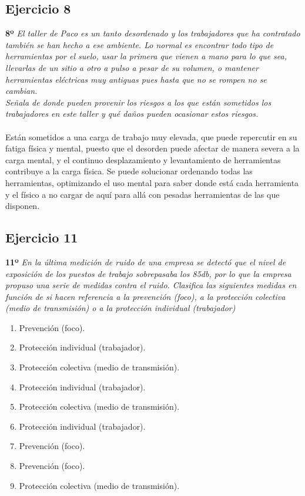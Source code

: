 \documentclass{article}
\begin{document}
      \subsection{Ejercicio 8}
        \textbf{8º} \textit{El taller de Paco es un tanto desordenado y los trabajadores que ha contratado también se han hecho a ese
        ambiente. Lo normal es encontrar todo tipo de herramientas por el suelo, usar la primera que vienen a mano para lo que sea, 
        llevarlas de un sitio a otro a pulso a pesar de su volumen, o mantener herramientas eléctricas muy antiguas pues hasta que no 
        se rompen no se cambian.\\
        Señala de donde pueden provenir los riesgos a los que están sometidos los trabajadores en este taller y qué daños pueden ocasionar
        estos riesgos.}
        \\\\
        Están sometidos a una carga de trabajo muy elevada, que puede repercutir en su fatiga física y mental, puesto que el desorden puede 
        afectar de manera severa a la carga mental, y el continuo desplazamiento y levantamiento de herramientas contribuye a la carga física.
        Se puede solucionar ordenando todas las herramientas, optimizando el uso mental para saber donde está cada herramienta y el físico a no
        cargar de aquí para allá con pesadas herramientas de las que disponen.

      \subsection{Ejercicio 11}

        \textbf{11º} \textit{En la última medición de ruido de una empresa se detectó que el nivel de exposición de los puestos de trabajo sobrepasaba los 85db, por lo que la 
        empresa propuso una serie de medidas contra el ruido. Clasifica las siguientes medidas en función de si hacen referencia a la prevención (foco), a la protección colectiva 
        (medio de transmisión) o a la protección individual (trabajador)}
        \begin{enumerate}
          \item Prevención (foco).
          \item Protección individual (trabajador).
          \item Protección colectiva (medio de transmisión).
          \item Protección individual (trabajador).
          \item Protección colectiva (medio de transmisión).
          \item Protección individual (trabajador).
          \item Prevención (foco).
          \item Prevención (foco).
          \item Protección colectiva (medio de transmisión).
        \end{enumerate}
\end{document}
